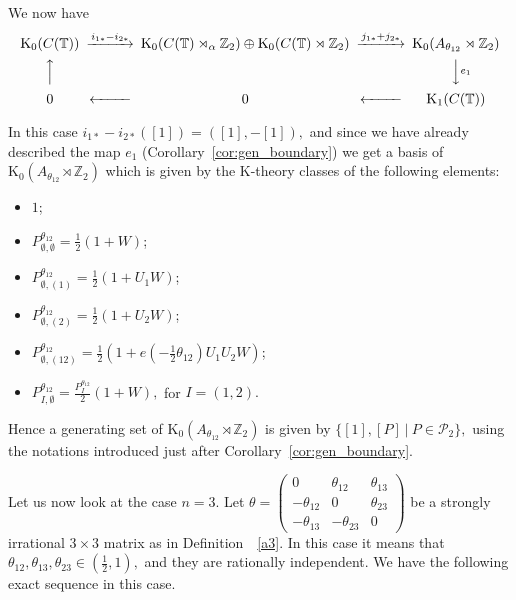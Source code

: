 \documentclass[9pt, BCOR=2mm]{amsart}
\numberwithin{equation}{section}
\numberwithin{equation}{section}
\newcommand{\Z}{{\mathbb{Z}}}
\newcommand{\T}{{\mathbb{T}}}
\newcommand{\K}{\mathrm{K}} %
\begin{document}
We now have
	{\[
\begin{CD}
\K_0 (C(\T)) @>{i_{1*}-i_{2*}}>>\K_0 (C(\T)\rtimes_\alpha  \Z_2)\oplus \K_0 (C(\T)\rtimes \Z_2)@>{j_{1*}+j_{2*}}>> \K_0(A_{\theta_{12}}\rtimes\Z_2)   \\
@A{}AA & &  @VV{e_1}V            \\
 0 @<<{}<  0 @<<{}< \K_1 (C(\T))
\end{CD}
\]} 
 
 In this case $i_{1*}-i_{2*}([1])=([1],-[1]),$ and since we have already described the map $e_1$ (Corollary~\ref{cor:gen_boundary}) we get a basis of $\K_0(A_{\theta_{12}}\rtimes\Z_2)$ which is given by the K-theory classes of the following elements:\\
 \begin{itemize}
 \item $1$;
 \item  $P^{\theta_{12}}_{\emptyset,\emptyset} = \frac{1}{2} (1+W)$;
 \item $P^{\theta_{12}}_{\emptyset,(1)}= \frac{1}{2} (1+U_1W)$;
 \item $P^{\theta_{12}}_{\emptyset,(2)}= \frac{1}{2} (1+U_2W)$;
 \item $P^{\theta_{12}}_{\emptyset,(12)}= \frac{1}{2} (1+e( -\frac{1}{2} {\theta_{12}})U_1U_2W)$;
 \item $P^{\theta_{12}}_{I,\emptyset}= \frac{P^{\theta_{12}}_{I}}{2}(1+W),$ for $I=(1,2).$  
 	\end{itemize}
 Hence a generating set of $\K_0(A_{\theta_{12}}\rtimes \Z_2)$ is given by 
 $\{[1], [P] ~|~ P\in \mathcal{P}_2\},$ using the notations introduced just after Corollary~\ref{cor:gen_boundary}.
    
 

Let us now look at the case $n=3.$ Let $\theta=\left(\begin{array}{ccc}0 & \theta_{12} & \theta_{13}\\ -\theta_{12} & 0 & \theta_{23} \\ -\theta_{13} & -\theta_{23} & 0 \end{array}\right)$ be a strongly irrational $3\times 3$ matrix as in Definition~~\ref{a3}. In this case it means that $\theta_{12}, \theta_{13}, \theta_{23} \in (\frac{1}{2},1),$ and they are rationally independent.
	We have the following exact sequence in this case.
\end{document}
